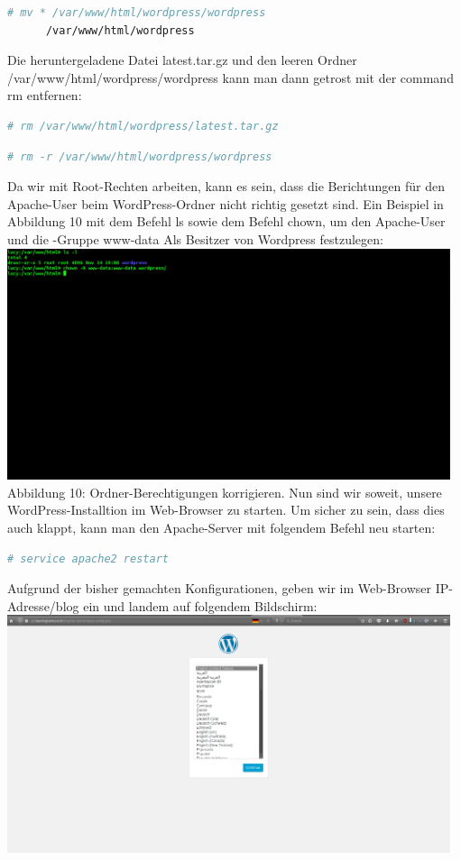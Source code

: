 \documentclass{article}
\begin{document}
	\newline
	\begin{lstlisting}[language=bash]
	# mv * /var/www/html/wordpress/wordpress 
	  /var/www/html/wordpress
	\end{lstlisting}
	Die heruntergeladene Datei latest.tar.gz und den leeren Ordner /var/www/html/wordpress/wordpress kann man dann getrost mit der command rm entfernen:
	\begin{lstlisting}[language=bash]
	# rm /var/www/html/wordpress/latest.tar.gz
	\end{lstlisting}
	\begin{lstlisting}[language=bash]
	# rm -r /var/www/html/wordpress/wordpress
	\end{lstlisting}
	Da wir mit Root-Rechten arbeiten, kann es sein, dass die Berichtungen für den Apache-User beim WordPress-Ordner nicht richtig gesetzt sind. Ein Beispiel in Abbildung 10 mit dem Befehl ls sowie dem Befehl chown, um den Apache-User und die -Gruppe www-data Als Besitzer von Wordpress festzulegen:
	\newline
	\newline
	\includegraphics[width=13cm]{../Pics/35-wordpress-permissions}
	Abbildung 10: Ordner-Berechtigungen korrigieren.
	\newline
	\newline
	Nun sind wir soweit, unsere WordPress-Installtion im Web-Browser zu starten. Um sicher zu sein, dass dies auch klappt, kann man den Apache-Server mit folgendem Befehl neu starten:
	\begin{lstlisting}[language=bash]
	# service apache2 restart
	\end{lstlisting}
	Aufgrund der bisher gemachten Konfigurationen, geben wir im Web-Browser IP-Adresse/blog ein und landem auf folgendem Bildschirm:
	\newline
	\newline
	\includegraphics[width=13cm]{../Pics/36-wordpress-konfbildschirm}
\end{document}
